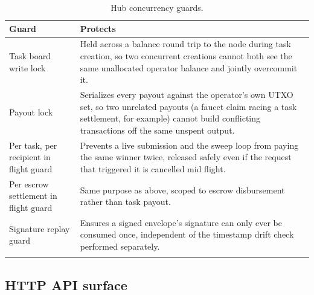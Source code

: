 \documentclass[11pt]{article}
\begin{document}
\begin{longtable}{@{}p{4.2cm}p{10.5cm}@{}}
\toprule
\textbf{Guard} & \textbf{Protects} \\
\midrule
\endhead
Task board write lock & Held across a balance round trip to the node during task creation, so two concurrent creations cannot both see the same unallocated operator balance and jointly overcommit it. \\
Payout lock & Serializes every payout against the operator's own UTXO set, so two unrelated payouts (a faucet claim racing a task settlement, for example) cannot build conflicting transactions off the same unspent output. \\
Per task, per recipient in flight guard & Prevents a live submission and the sweep loop from paying the same winner twice, released safely even if the request that triggered it is cancelled mid flight. \\
Per escrow settlement in flight guard & Same purpose as above, scoped to escrow disbursement rather than task payout. \\
Signature replay guard & Ensures a signed envelope's signature can only ever be consumed once, independent of the timestamp drift check performed separately. \\
\bottomrule
\caption{Hub concurrency guards.}
\label{tab:locks}
\end{longtable}

\subsection{HTTP API surface}
\end{document}
